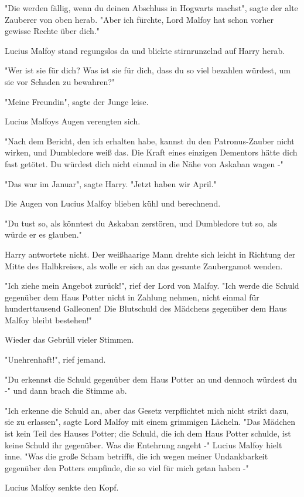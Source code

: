 {"Die werden fällig, wenn du deinen Abschluss in Hogwarts machst", sagte der alte Zauberer von oben herab. "Aber ich fürchte, Lord Malfoy hat schon vorher gewisse Rechte über dich."

Lucius Malfoy stand regungslos da und blickte stirnrunzelnd auf Harry herab.

"Wer ist sie für dich? Was ist sie für dich, dass du so viel bezahlen würdest, um sie vor Schaden zu bewahren?"

"Meine Freundin", sagte der Junge leise.

Lucius Malfoys Augen verengten sich.

"Nach dem Bericht, den ich erhalten habe, kannst du den Patronus-Zauber nicht wirken, und Dumbledore weiß das. Die Kraft eines einzigen Dementors hätte dich fast getötet. Du würdest dich nicht einmal in die Nähe von Askaban wagen -"

"Das war im Januar", sagte Harry. "Jetzt haben wir April."

Die Augen von Lucius Malfoy blieben kühl und berechnend.

"Du tust so, als könntest du Askaban zerstören, und Dumbledore tut so, als würde er es glauben."

Harry antwortete nicht. Der weißhaarige Mann drehte sich leicht in Richtung der Mitte des Halbkreises, als wolle er sich an das gesamte Zaubergamot wenden.

"Ich ziehe mein Angebot zurück!", rief der Lord von Malfoy. "Ich werde die Schuld gegenüber dem Haus Potter nicht in Zahlung nehmen, nicht einmal für hunderttausend Galleonen! Die Blutschuld des Mädchens gegenüber dem Haus Malfoy bleibt bestehen!"

Wieder das Gebrüll vieler Stimmen.

"Unehrenhaft!", rief jemand.

"Du erkennst die Schuld gegenüber dem Haus Potter an und dennoch würdest du -" und dann brach die Stimme ab.

"Ich erkenne die Schuld an, aber das Gesetz verpflichtet mich nicht strikt dazu, sie zu erlassen", sagte Lord Malfoy mit einem grimmigen Lächeln. "Das Mädchen ist kein Teil des Hauses Potter; die Schuld, die ich dem Haus Potter schulde, ist keine Schuld ihr gegenüber. Was die Entehrung angeht -" Lucius Malfoy hielt inne. "Was die große Scham betrifft, die ich wegen meiner Undankbarkeit gegenüber den Potters empfinde, die so viel für mich getan haben -"

Lucius Malfoy senkte den Kopf.

}
